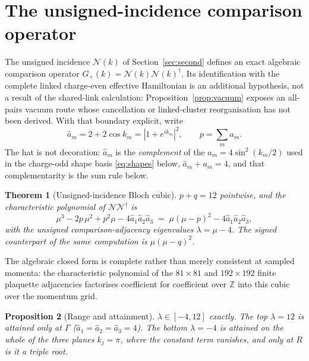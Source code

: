 \documentclass[11pt]{article}
\theoremstyle{plain}
\newtheorem{theorem}{Theorem}
\newtheorem{proposition}[theorem]{Proposition}
\theoremstyle{definition}
\theoremstyle{remark}
\newcommand{\chk}[1]{}
\newcommand{\dg}{^{\dagger}}
\begin{document}
\section{The unsigned-incidence comparison operator}
\label{sec:even}

The unsigned incidence $\mathcal N(k)$ of Section~\ref{sec:second} defines an
exact algebraic comparison operator
$G_+(k)=\mathcal N(k)\mathcal N(k)\dg$. Its identification with the complete
linked charge-even effective Hamiltonian is an additional hypothesis, not a
result of the shared-link calculation: Proposition~\ref{prop:vacuum} exposes
an all-pairs vacuum route whose cancellation or linked-cluster reorganisation
has not been derived. With that boundary explicit, write
\[
  \hat a_m=2+2\cos k_m=|1+e^{ik_m}|^2,\qquad p=\sum_m \hat a_m .
\]
The hat is not decoration: $\hat a_m$ is the \emph{complement} of the
$a_m=4\sin^2(k_m/2)$ used in the charge-odd shape basis \eqref{eq:shapes}
below,
$\hat a_m+a_m=4$, and that complementarity is the sum rule below.

\begin{theorem}[Unsigned-incidence Bloch cubic]\label{thm:evencubic}
$p+q=12$ pointwise, and the characteristic polynomial of
$\mathcal N\mathcal N\dg$ is
\[
  \mu^3-2p\,\mu^2+p^2\mu-4\hat a_1\hat a_2\hat a_3
  \;=\;\mu(\mu-p)^2-4\hat a_1\hat a_2\hat a_3 ,
\]
with the unsigned comparison-adjacency eigenvalues $\lambda=\mu-4$. The signed
counterpart of the same computation is $\mu(\mu-q)^2$.
\end{theorem}
\chk{the C-even characteristic polynomial is mu(mu - p)\^{}2 = 4 a\_1 a\_2 a\_3}
\chk{p + q = 12: one zone function runs both sectors}

The algebraic closed form is complete rather than merely consistent at sampled momenta:
the characteristic polynomial of the $81\times81$ and $192\times192$ finite
plaquette adjacencies factorises coefficient for coefficient over $\mathbb Z$
into this cubic over the momentum grid.
\chk{the Bloch cubic IS the finite L = 3 and L = 4 plaquette spectrum, exactly}

\begin{proposition}[Range and attainment]\label{prop:evenrange}
$\lambda\in[-4,12]$ exactly. The top $\lambda=12$ is attained only at $\Gamma$
($\hat a_1=\hat a_2=\hat a_3=4$). The bottom $\lambda=-4$ is attained on the
whole of the three planes $k_j=\pi$, where the constant term vanishes, and only
at $R$ is it a triple root.
\end{proposition}
\end{document}
